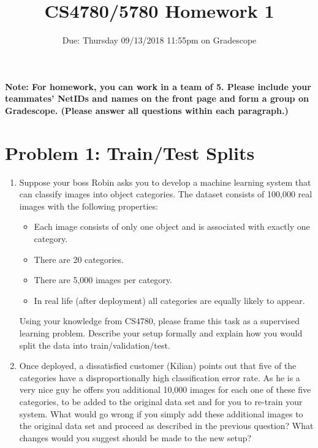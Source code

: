 \documentclass[11pt]{article}
\title{CS4780/5780 Homework 1}
\author{Due: Thursday 09/13/2018 11:55pm on Gradescope}
\date{}
\begin{document}
    \maketitle
    \noindent
    \textbf{Note: For homework, you can work in a team of 5. Please include your teammates' NetIDs and names on the front page and form a group on Gradescope. (Please answer all questions within each paragraph.)}
    \section*{Problem 1: Train/Test Splits}
    \begin{enumerate}
      \item Suppose your boss Robin asks you to develop a machine learning system that can classify images into object categories. The dataset consists of 100,000 real images with the following properties:
      \begin{itemize}
        \item Each image consists of only one object and is associated with exactly one category. 
        \item There are 20 categories.
        \item There are 5,000 images per category.
        \item In real life (after deployment) all categories are equally likely to appear. 
      \end{itemize}
      Using your knowledge from CS4780, please frame this task as a supervised learning problem. Describe your setup formally and explain how you would split the data into train/validation/test. 
       
      \item Once deployed, a dissatisfied customer (Kilian) points out that five of the categories have a disproportionally high classification error rate. As he is a very nice guy he offers you additional 10,000 images for each one of these five categories, to be added to the original data set and for you to re-train your system. What would go wrong if you simply add these additional images to the original data set and proceed as described in the previous question? What changes would you suggest should be made to the new setup?
    \end{enumerate}
    
\end{document}
